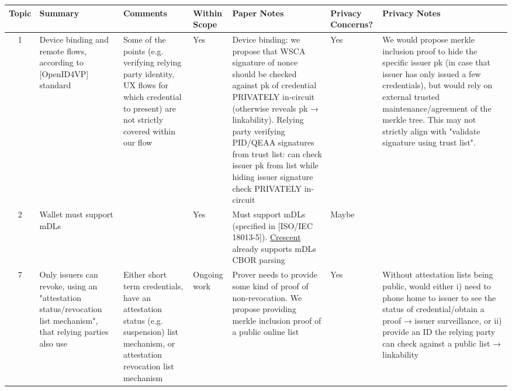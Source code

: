 \footnotesize
\begin{longtable}{|c|p{}|p{}|p{}|p{}|p{}|p{}|}
\hline
\textbf{Topic} & \textbf{Summary} & \textbf{Comments} & \textbf{Within Scope} & \textbf{Paper Notes} & \textbf{Privacy Concerns?} & \textbf{Privacy Notes} \\
\hline
\endhead


1 & Device binding and remote flows, according to [OpenID4VP] standard & Some of the points (e.g. verifying relying party identity, UX flows for which credential to present) are not strictly covered within our flow & Yes & Device binding: we propose that WSCA signature of nonce should be checked against pk of credential PRIVATELY in-circuit (otherwise reveals pk → linkability). Relying party verifying PID/QEAA signatures from trust list: can check issuer pk from list while hiding issuer signature check PRIVATELY in-circuit & Yes & We would propose merkle inclusion proof to hide the specific issuer pk (in case that issuer has only issued a few credentials), but would rely on external trusted maintenance/agreement of the merkle tree. This may not strictly align with "validate signature using trust list". \\
\hline

2 & Wallet must support mDLs & & Yes & Must support mDLs (specified in [ISO/IEC 18013-5]). \href{https://github.com/microsoft/crescent-credentials}{Crescent} already supports mDLs CBOR parsing & Maybe & \\
\hline

7 & Only issuers can revoke, using an "attestation status/revocation list mechanism", that relying parties also use & Either short term credentials, have an attestation status (e.g. suspension) list mechanism, or attestation revocation list mechanism & Ongoing work & Prover needs to provide some kind of proof of non-revocation. We propose providing merkle inclusion proof of a public online list & Yes & Without attestation lists being public, would either i) need to phone home to issuer to see the status of credential/obtain a proof → issuer surveillance, or ii) provide an ID the relying party can check against a public list → linkability \\
\hline


\end{longtable}
